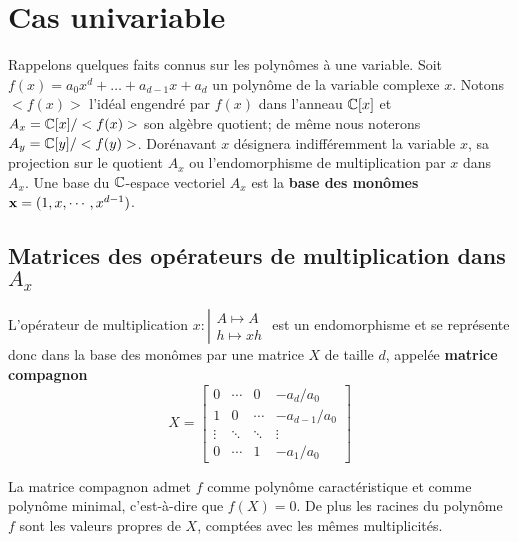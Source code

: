 \documentclass{standalone}
\begin{document}
  \section{Cas univariable}
  \label{univariable}

  Rappelons quelques faits connus sur les polynômes à une variable.
  Soit $f(x) = a_0x^d + \dots + a_{d-1}x + a_d$ un polynôme de la variable complexe $x$. Notons $<f(x)>$ l'idéal engendré par $f(x)$ dans l'anneau $\mathbb{C}[x]$ et $A_x = \mathbb{C}[x]/<f(x)>$  son algèbre quotient; de même nous noterons $A_y = \mathbb{C}[y]/<f(y)>$. Dorénavant $x$ désignera indifféremment la variable $x$, sa projection sur le quotient $A_x$ ou l'endomorphisme de multiplication par $x$ dans $A_x$. Une base du $\mathbb{C}$-espace vectoriel $A_x$ est la {\bf base des monômes} $\bold{x} = (1, x,\cdots, x^{d-1})$.

  \subsection{Matrices des opérateurs de multiplication dans $A_x$}
  L'opérateur de multiplication
  $x : \left\vert
  \begin{array}{c}
  A \mapsto A \\
  h \mapsto xh
  \end{array}
  \right.$
  est un endomorphisme et se représente donc dans la base des monômes par une matrice $X$ de taille $d$, appelée {\bf matrice compagnon}
  \begin{equation}
  \label{compan}
  X =
  \begin{bmatrix}
  	0 & \cdots & 0 & -a_d/a_0 \\
  	1 & 0 & \cdots & -a_{d-1}/a_0 \\
  	\vdots  & \ddots  & \ddots & \vdots  \\
  	0 & \cdots & 1 & -a_1/a_0
  \end{bmatrix}
  \end{equation}

  \begin{prop}
  \label{compan2roots}
  La matrice compagnon admet $f$ comme polynôme caractéristique et comme polynôme minimal, c'est-à-dire que $f(X) = 0$. De plus les racines du polynôme $f$ sont les valeurs propres de $X$, comptées avec les mêmes multiplicités.
  \end{prop}
\end{document}
